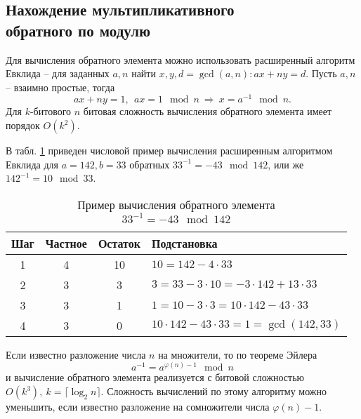 \subsection[Нахождение мультипликативного обратного]{Нахождение мультипликативного \protect\\ обратного по модулю}

Для вычисления обратного элемента можно использовать расширенный алгоритм Евклида -- для заданных $a, n$ найти $x, y, d = \gcd(a,n): ax + ny = d$. Пусть $a,n$ -- взаимно простые, тогда
    \[ ax + ny = 1, ~~ ax = 1 \mod n ~ \Rightarrow ~ x = a^{-1} \mod n. \]
Для $k$-битового $n$ битовая сложность вычисления обратного элемента имеет порядок $O(k^2)$.

\example
В табл. \ref{tab:extended-euclid-inverse} приведен числовой пример вычисления расширенным алгоритмом Евклида для $a=142, b=33$ обратных $33^{-1} = -43 \mod 142$, или же $142^{-1} = 10 \mod 33$.

\begin{table}[!ht]
    \centering
    \caption{Пример вычисления обратного элемента \\ $33^{-1}  = -43 \mod 142$\label{tab:extended-euclid-inverse}}
    \begin{tabular}{|c|c|c|l|}
        \hline
        Шаг & Частное & Остаток & Подстановка \\
        \hline
        1 & 4 & 10 & $10 = 142 - 4 \cdot 33$ \\
        2 & 3 & 3  & $3 = 33 - 3 \cdot 10 = -3 \cdot 142 + 13 \cdot 33$ \\
        3 & 3 & 1  & $1 = 10 - 3 \cdot 3 = 10 \cdot 142 - 43 \cdot 33$ \\
        4 & 3 & 0  & $10 \cdot 142 - 43 \cdot 33 = 1 = \gcd(142,33)$ \\
        \hline
    \end{tabular}
\end{table}
\exampleend

Если известно разложение числа $n$ на множители, то по теореме Эйлера
    \[ a^{-1} = a^{\varphi(n) - 1} \mod n \]
и вычисление обратного элемента реализуется с битовой сложностью $O(k^3),~ k = \lceil \log_2 n \rceil$. Сложность вычислений по этому алгоритму можно уменьшить, если известно разложение на сомножители числа $\varphi(n) - 1$.
